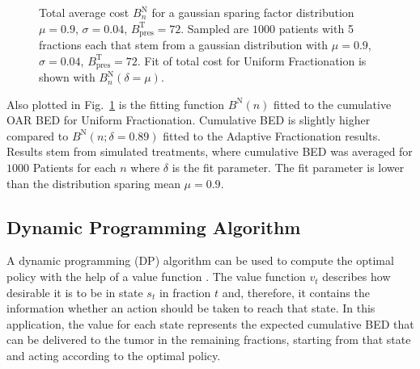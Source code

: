 \documentclass[\relativeRoot/ada.tex]{subfiles}
\begin{document}
\begin{figure}[!htb]
    
\caption{Total average cost $B^{\text{N}}_n$ for a gaussian sparing factor distribution $\mu=0.9$, $\sigma=0.04$, $B_{\text{pres}}^{\text{T}}=72$. Sampled are $1000$ patients with 5 fractions each that stem from a gaussian distribution with $\mu=0.9$, $\sigma=0.04$, $B_{\text{pres}}^{\text{T}}=72$. Fit of total cost for Uniform Fractionation is shown with $B^{\text{N}}_n(\delta=\mu)$.}
\label{fig:cost_function}
\end{figure}
Also plotted in Fig.~\ref{fig:cost_function} is the fitting function $B^{\text{N}}(n)$ fitted to the cumulative OAR BED for Uniform Fractionation. Cumulative BED is slightly higher compared to $B^{\text{N}}(n; \delta=0.89)$ fitted to the Adaptive Fractionation results. Results stem from simulated treatments, where cumulative BED was averaged for $1000$ Patients for each $n$ where $\delta$ is the fit parameter. The fit parameter is lower than the distribution sparing mean $\mu=0.9$.


\subsection{Dynamic Programming Algorithm}
\label{sec:DP}
A dynamic programming (DP) algorithm can be used to compute the optimal policy with the help of a value function \cite{sutton_reinforcement}. The value function $v_t$ describes how desirable it is to be in state $s_t$ in fraction $t$ and, therefore, it contains the information whether an action should be taken to reach that state. In this application, the value for each state represents the expected cumulative BED that can be delivered to the tumor in the remaining fractions, starting from that state and acting according to the optimal policy.
\end{document}
